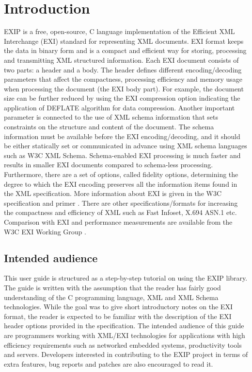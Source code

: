\section{Introduction}
\label{sec:Introduction}

EXIP is a free, open-source, C language implementation of the Efficient XML Interchange (EXI) standard for representing XML documents.
EXI format keeps the data in binary form and is a compact and efficient way for storing, processing and transmitting
XML structured information. Each EXI document consists of two parts: a header and a body. The header defines different
encoding/decoding parameters that affect the compactness, processing efficiency and memory usage when processing the
document (the EXI body part). For example, the document size can be further reduced by using the EXI compression option indicating the
application of DEFLATE algorithm for data compression. Another important parameter is connected to the use of XML
schema information that sets constraints on the structure and content of the document. The schema information must
be available before the EXI encoding/decoding, and it should be either statically set or communicated in advance
using XML schema languages such as W3C XML Schema. Schema-enabled EXI processing is much faster and results in
smaller EXI documents compared to schema-less processing. Furthermore, there are a set of options, called fidelity
options, determining the degree to which the EXI encoding preserves all the information items found in the XML
specification. More information about EXI is given in the W3C specification \cite{EXI1} and
primer \cite{Peintner2009a}. There are other specifications/formats for increasing the compactness and efficiency
of XML such as Fast Infoset, X.694 ASN.1 etc. Comparison with EXI and performance measurements are available from
the W3C EXI Working Group \cite{Bournez2009, White2007}.

\subsection{Intended audience}
\label{sec:audience}
This user guide is structured as a step-by-step tutorial on using the EXIP library. The guide is written with the
assumption that the reader has fairly good understanding of the C programming language, XML and XML Schema technologies.
While the goal was to give short introductory notes on the EXI format, the reader is expected to be familiar with the
description of the EXI header options provided in the specification. The intended audience of this guide are
programmers working with XML/EXI technologies for applications with high efficiency requirements such as networked
embedded systems, productivity tools and servers. Developers interested in contributing to the EXIP project in
terms of extra features, bug reports and patches are also encouraged to read it.

